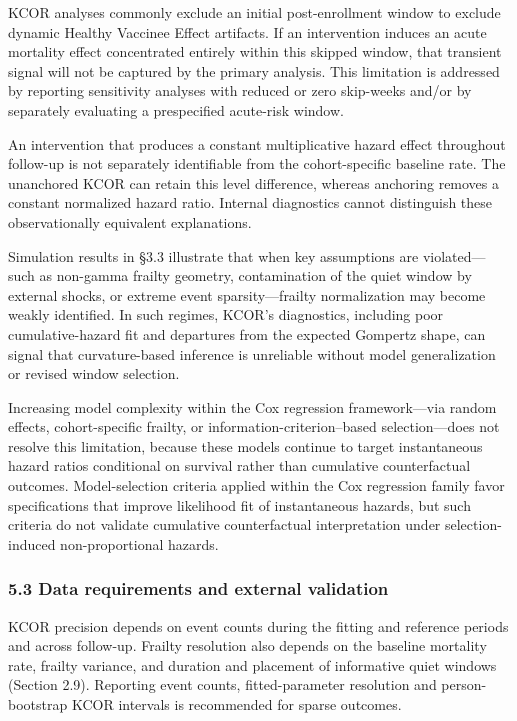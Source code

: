 \documentclass[
]{article}
\begin{document}
KCOR analyses commonly exclude an initial post-enrollment window to exclude dynamic Healthy Vaccinee Effect artifacts. If an intervention induces an acute mortality effect concentrated entirely within this skipped window, that transient signal will not be captured by the primary analysis. This limitation is addressed by reporting sensitivity analyses with reduced or zero skip-weeks and/or by separately evaluating a prespecified acute-risk window.

An intervention that produces a constant multiplicative hazard effect throughout follow-up is not separately identifiable from the cohort-specific baseline rate. The unanchored KCOR can retain this level difference, whereas anchoring removes a constant normalized hazard ratio. Internal diagnostics cannot distinguish these observationally equivalent explanations.

Simulation results in §3.3 illustrate that when key assumptions are violated---such as non-gamma frailty geometry, contamination of the quiet window by external shocks, or extreme event sparsity---frailty normalization may become weakly identified. In such regimes, KCOR's diagnostics, including poor cumulative-hazard fit and departures from the expected Gompertz shape, can signal that curvature-based inference is unreliable without model generalization or revised window selection.

Increasing model complexity within the Cox regression framework---via random effects, cohort-specific frailty, or information-criterion--based selection---does not resolve this limitation, because these models continue to target instantaneous hazard ratios conditional on survival rather than cumulative counterfactual outcomes. Model-selection criteria applied within the Cox regression family favor specifications that improve likelihood fit of instantaneous hazards, but such criteria do not validate cumulative counterfactual interpretation under selection-induced non-proportional hazards.

\subsubsection{5.3 Data requirements and external validation}\label{data-requirements-and-external-validation}

KCOR precision depends on event counts during the fitting and reference periods and across follow-up. Frailty resolution also depends on the baseline mortality rate, frailty variance, and duration and placement of informative quiet windows (Section 2.9). Reporting event counts, fitted-parameter resolution and person-bootstrap KCOR intervals is recommended for sparse outcomes.
\end{document}
